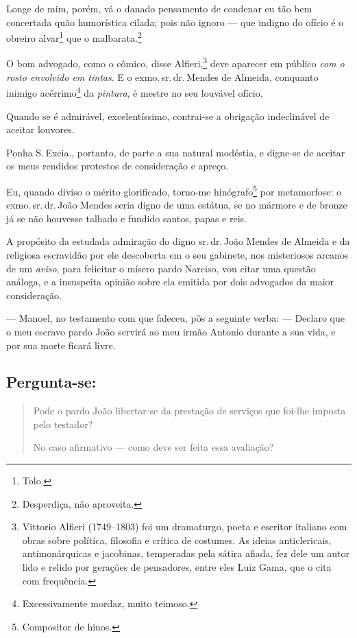 Longe de mim, porém, vá o danado pensamento de condenar eu tão bem
concertada quão humorística cilada; pois não ignoro --- que indigno do
ofício é o obreiro alvar\footnote{ Tolo.} que o
malbarata.\footnote{ Desperdiça, não aproveita.}

O bom advogado, como o cômico, disse
Alfieri,\footnote{ Vittorio Alfieri (1749--1803)
  foi um dramaturgo, poeta e escritor italiano com obras sobre política,
  filosofia e crítica de costumes. As ideias anticlericais,
  antimonárquicas e jacobinas, temperadas pela sátira afiada, fez dele
  um autor lido e relido por gerações de pensadores, entre eles Luiz
  Gama, que o cita com frequência.} deve aparecer em público \emph{com o
rosto envolvido em tintas}. E o exmo.\,sr.\,dr.\,Mendes de Almeida,
conquanto inimigo acérrimo\footnote{ Excessivamente mordaz, muito
  teimoso.} da \emph{pintura}, é mestre no seu louvável ofício.

Quando se é admirável, excelentíssimo, contrai-se a obrigação
indeclinável de aceitar louvores.

Ponha S.\,Excia., portanto, de parte a sua natural modéstia, e digne-se
de aceitar os meus rendidos protestos de consideração e apreço.

Eu, quando diviso o mérito glorificado, torno-me hinógrafo\footnote{
  Compositor de hinos.} por metamorfose: o exmo.\,sr.\,dr.\,João Mendes
seria digno de uma estátua, se no mármore e de bronze já se não houvesse
talhado e fundido santos, papas e reis.

A propósito da estudada admiração do digno sr.\,dr.\,João Mendes de
Almeida e da religiosa escravidão por ele descoberta em o seu gabinete,
nos misteriosos arcanos de um \emph{aviso}, para felicitar o mísero
pardo Narciso, vou citar uma questão análoga, e a insuspeita opinião
sobre ela emitida por dois advogados da maior consideração.

--- Manoel, no testamento com que faleceu, pôs a seguinte verba: ---
Declaro que o meu escravo pardo João servirá ao meu irmão Antonio
durante a sua vida, e por sua morte ficará livre.

\subsection{Pergunta-se:}

\begin{quote}
Pode o pardo João libertar-se da prestação de serviços que foi-lhe
imposta pelo testador?

No caso afirmativo --- como deve ser feita essa avaliação?
\end{quote}

